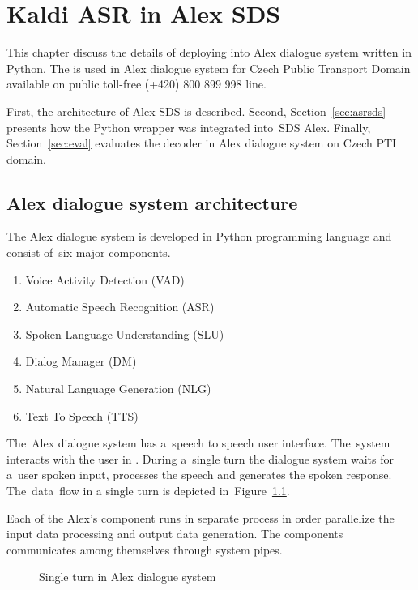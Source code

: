 \chapter{Kaldi \acs{ASR} in Alex \acs{SDS}}
\label{cha:integration}

This chapter discuss the details of deploying  into Alex dialogue system written in Python.
The  is used in Alex dialogue system for Czech Public Transport Domain available on public toll-free (+420) 800 899 998 line.

First, the architecture of Alex \acf{SDS} is described.
Second, Section~\ref{sec:asrsds} presents how the Python wrapper  was integrated into~\ac{SDS} Alex.
Finally, Section~\ref{sec:eval} evaluates the decoder in Alex dialogue system on Czech \ac{PTI} domain. 

\section{Alex dialogue system architecture} 
\label{sec:arch}
The Alex dialogue system is developed in Python programming language and consist of~six major components. 
\begin{enumerate}
    \item Voice Activity Detection (VAD)
    \item Automatic Speech Recognition (ASR) 
    \item Spoken Language Understanding (SLU)
    \item Dialog Manager (DM)
    \item Natural Language Generation (NLG)
    \item Text To Speech (TTS)
\end{enumerate}
The~Alex dialogue system has a~speech to speech user interface. 
The~system interacts with the user in . 
During a~single turn the dialogue system waits for a~user spoken input, processes the speech and generates the spoken response.
The~data~flow in a single turn is depicted in~Figure~\ref{fig:alex}.

Each of the Alex's component runs in separate process in order parallelize the input data processing and output data generation.
The components communicates among themselves through system pipes.

\begin{figure}
    \begin{center}
    
    \caption{Single turn in Alex dialogue system}
    \label{fig:alex} 
    \end{center}
\end{figure}

